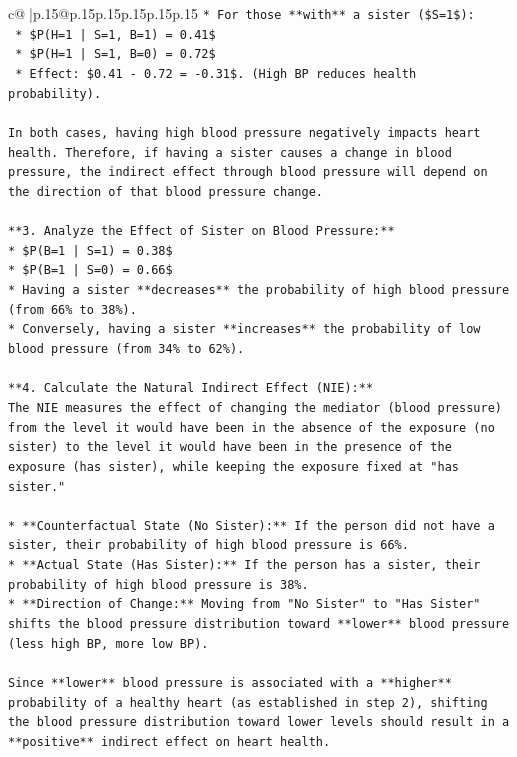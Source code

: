 \documentclass{article}
\begin{document}
{\begin{supertabular}{c@{$\;$}|p{.15\linewidth}@{}p{.15\linewidth}p{.15\linewidth}p{.15\linewidth}p{.15\linewidth}p{.15\linewidth}}
{{{\texttt{*   For those **with** a sister (\$S=1\$):} \\
\texttt{    *   \$P(H=1 | S=1, B=1) = 0.41\$} \\
\texttt{    *   \$P(H=1 | S=1, B=0) = 0.72\$} \\
\texttt{    *   Effect: \$0.41 {-} 0.72 = {-}0.31\$. (High BP reduces health probability).} \\
\\ 
\texttt{In both cases, having high blood pressure negatively impacts heart health. Therefore, if having a sister causes a change in blood pressure, the indirect effect through blood pressure will depend on the direction of that blood pressure change.} \\
\\ 
\texttt{**3. Analyze the Effect of Sister on Blood Pressure:**} \\
\texttt{*   \$P(B=1 | S=1) = 0.38\$} \\
\texttt{*   \$P(B=1 | S=0) = 0.66\$} \\
\texttt{*   Having a sister **decreases** the probability of high blood pressure (from 66\% to 38\%).} \\
\texttt{*   Conversely, having a sister **increases** the probability of low blood pressure (from 34\% to 62\%).} \\
\\ 
\texttt{**4. Calculate the Natural Indirect Effect (NIE):**} \\
\texttt{The NIE measures the effect of changing the mediator (blood pressure) from the level it would have been in the absence of the exposure (no sister) to the level it would have been in the presence of the exposure (has sister), while keeping the exposure fixed at "has sister."} \\
\\ 
\texttt{*   **Counterfactual State (No Sister):** If the person did not have a sister, their probability of high blood pressure is 66\%.} \\
\texttt{*   **Actual State (Has Sister):** If the person has a sister, their probability of high blood pressure is 38\%.} \\
\texttt{*   **Direction of Change:** Moving from "No Sister" to "Has Sister" shifts the blood pressure distribution toward **lower** blood pressure (less high BP, more low BP).} \\
\\ 
\texttt{Since **lower** blood pressure is associated with a **higher** probability of a healthy heart (as established in step 2), shifting the blood pressure distribution toward lower levels should result in a **positive** indirect effect on heart health.} \\
}}}
\end{supertabular}}
\end{document}
